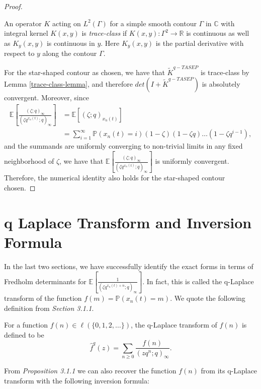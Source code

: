 \begin{proof}
\begin{lemma}
\label{trace-class-lemma}
An operator $K$ acting on $L^2(\Gamma)$ for a simple smooth contour $\Gamma$ in $\mathbb{C}$ with integral kernel $K(x,y)$ is \emph{trace-class} if $K(x,y): \Gamma^2 \rightarrow \mathbb{R}$ is continuous as well as $K_y(x,y)$ is continuous in $y$. Here $K_y(x,y)$ is the partial derivative with respect to $y$ along the contour $\Gamma$.
\end{lemma}
For the star-shaped contour as chosen, we have that $\tilde{K}^{q-TASEP}$ is trace-class by Lemma \ref{trace-class-lemma}, and therefore $det(I+\tilde{K}^{q-TASEP})$ is absolutely convergent. Moreover, since 
\begin{align*}
\mathbb{E} \left[ \frac{(\zeta;q)_{\infty}}{(\zeta q^{x_n(t)}; q)_{\infty}} \right] &= \mathbb{E} \left[ (\zeta; q)_{x_n(t)} \right] \\
&= \sum_{i=1}^{\infty} \mathbb{P}(x_n(t) = i) (1-\zeta) (1-\zeta q) \dots (1-\zeta q^{i-1}),
\end{align*}
and the summands are uniformly converging to non-trivial limits in any fixed neighborhood of $\zeta$, we have that $\mathbb{E} \left[ \frac{(\zeta;q)_{\infty}}{(\zeta q^{x_n(t)}; q)_{\infty}} \right]$ is uniformly convergent. Therefore, the numerical identity also holds for the star-shaped contour chosen.
\end{proof}

\section{q Laplace Transform and Inversion Formula}
In the last two sections, we have successfully identify the exact forms in terms of Fredholm determinants for $\mathbb{E}\left[ \frac{1}{(\zeta q^{x_n(t) + n}; q)_{\infty}} \right]$. In fact, this is called the q-Laplace transform of the function $f(m) = \mathbb{P}(x_n(t) = m)$. We quote the following definition from \cite{macdonald2014} \textit{Section 3.1.1}.

\begin{definition}
For a function $f(n) \in \ell(\{0,1,2,\dots \})$, the q-Laplace transform of $f(n)$ is defined to be $$\hat{f}^q(z) = \sum_{n \ge 0} \frac{f(n)}{(zq^n;q)_{\infty}}.$$
\end{definition}

From \cite{macdonald2014} \textit{ Proposition 3.1.1 } we can also recover the function $f(n)$ from its q-Laplace transform with the following inversion formula:

